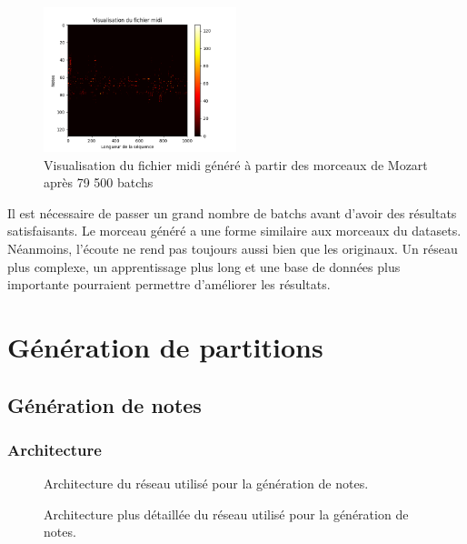 \begin{figure}[!h]
  \centering
  \includegraphics[width=0.5\textwidth]{images/chapter9/midi_generated_mozart_79500.png}
  \caption{Visualisation du fichier midi généré à partir des morceaux de Mozart après 79 500 batchs}
  \label{midi_generated_mozart}
\end{figure}

Il est nécessaire de passer un grand nombre de batchs avant d'avoir des résultats satisfaisants. Le morceau généré a une forme similaire aux morceaux du datasets. Néanmoins, l'écoute ne rend pas toujours aussi bien que les originaux. Un réseau plus complexe, un apprentissage plus long et une base de données plus importante pourraient permettre d'améliorer les résultats.


\section{Génération de partitions}

\subsection{Génération de notes}

\subsubsection{Architecture}

\begin{figure}[h!]
\begin{center}

\caption{Architecture du réseau utilisé pour la génération de notes.}
\end{center}
\end{figure}

\begin{figure}[h!]
\begin{center}

\caption{Architecture plus détaillée du réseau utilisé pour la génération de notes.}
\end{center}
\end{figure}

